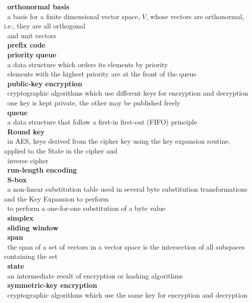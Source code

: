 \documentclass[10pt,letterpaper]{scrartcl}
\newcommand{\tbul}{\textbullet}
\newcommand{\tend}{\>\textendash}
\begin{document}
\begin{tabbing}
\tbul\ \textbf{orthonormal basis} \\
    \tend\ a basis for a finite dimensional vector space, $V$, whose vectors are orthonormal, i.e., they are all orthogonal \\ \>\ and unit vectors \\
\tbul\ \textbf{prefix code} \\
\tbul\ \textbf{priority queue} \\
    \tend\ a data structure which orders its elements by priority \\
    \tend\ elements with the highest priority are at the front of the queue \\
\tbul\ \textbf{public-key encryption} \\
    \tend\ cryptographic algorithms which use different keys for encryption and decryption \\
    \tend\ one key is kept private, the other may be published freely \\
\tbul\ \textbf{queue} \\
    \tend\ a data structure that follow a first-in first-out (FIFO) principle \\
\tbul\ \textbf{Round key} \\
    \tend\ in AES, keys derived from the cipher key using the key expansion routine, applied to the State in the cipher and \\ \>\ inverse cipher \\
\tbul\ \textbf{run-length encoding} \\
\tbul\ \textbf{S-box} \\
    \tend\ a non-linear substitution table used in several byte substitution transformations and the Key Expansion to perform \\ \>\ to perform a one-for-one substitution of a byte value \\
\tbul\ \textbf{simplex} \\
\tbul\ \textbf{sliding window} \\
\tbul\ \textbf{span} \\
    \tend\ the span of a set of vectors in a vector space is the intersection of all subspaces containing the set \\
\tbul\ \textbf{state} \\
    \tend\ an intermediate result of encryption or hashing algorithms \\
\tbul\ \textbf{symmetric-key encryption} \\
    \tend\ cryptographic algorithms which use the same key for encryption and decryption \\

\end{tabbing}
\end{document}
